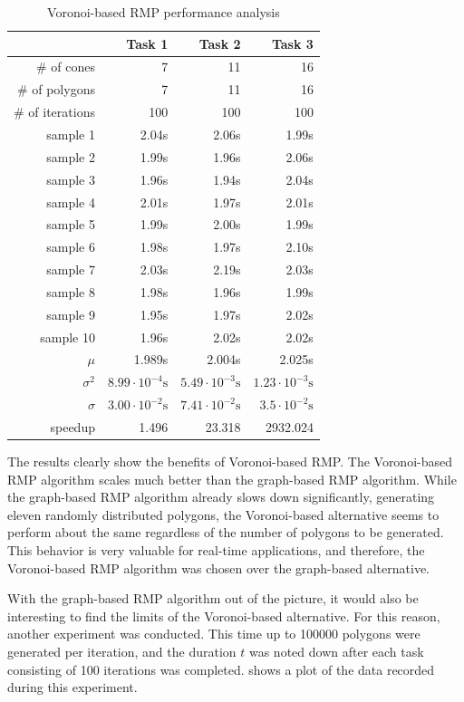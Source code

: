 \documentclass[11pt,a4paper,twoside,openright]{report}
\begin{document}
\begin{table}[p]
\centering
\caption{Voronoi-based RMP performance analysis}
\label{tab:voronoiperformanceanalysis}
\begin{tabular}{|r|r|r|r|}
\hline
 & Task 1 & Task 2 & Task 3 \\ \hline
\# of cones & 7 & 11 & 16 \\ \hline
\# of polygons & 7 & 11 & 16 \\ \hline
\# of iterations & 100 & 100 & 100 \\ \hline
sample 1 & 2.04s & 2.06s & 1.99s \\ \hline
sample 2 & 1.99s & 1.96s & 2.06s \\ \hline
sample 3 & 1.96s & 1.94s & 2.04s \\ \hline
sample 4 & 2.01s & 1.97s & 2.01s \\ \hline
sample 5 & 1.99s & 2.00s & 1.99s \\ \hline
sample 6 & 1.98s & 1.97s & 2.10s \\ \hline
sample 7 & 2.03s & 2.19s & 2.03s \\ \hline
sample 8 & 1.98s & 1.96s & 1.99s \\ \hline
sample 9 & 1.95s & 1.97s & 2.02s \\ \hline
sample 10 & 1.96s & 2.02s & 2.02s \\ \hline
$\mu$ & 1.989s & 2.004s & 2.025s \\ \hline
$\sigma^2$ & $8.99 \cdot 10^{-4}\textrm{s}$ & $5.49 \cdot 10^{-3}\textrm{s} $ & $1.23 \cdot 10^{-3}\textrm{s}$ \\ \hline
$\sigma$ & $3.00 \cdot 10^{-2}\textrm{s}$ & $7.41 \cdot 10^{-2}\textrm{s}$ & $3.5 \cdot 10^{-2}\textrm{s}$ \\ \hline
speedup & 1.496 & 23.318 & 2932.024 \\ \hline
\end{tabular}
\end{table}

The results clearly show the benefits of Voronoi-based RMP. The Voronoi-based RMP algorithm scales much better than the graph-based RMP algorithm. While the graph-based RMP algorithm already slows down significantly, generating eleven randomly distributed polygons, the Voronoi-based alternative seems to perform about the same regardless of the number of polygons to be generated. This behavior is very valuable for real-time applications, and therefore, the Voronoi-based RMP algorithm was chosen over the graph-based alternative.

With the graph-based RMP algorithm out of the picture, it would also be interesting to find the limits of the Voronoi-based alternative. For this reason, another experiment was conducted. This time up to 100000 polygons were generated per iteration, and the duration $t$ was noted down after each task consisting of 100 iterations was completed.  shows a plot of the data recorded during this experiment.
\end{document}
